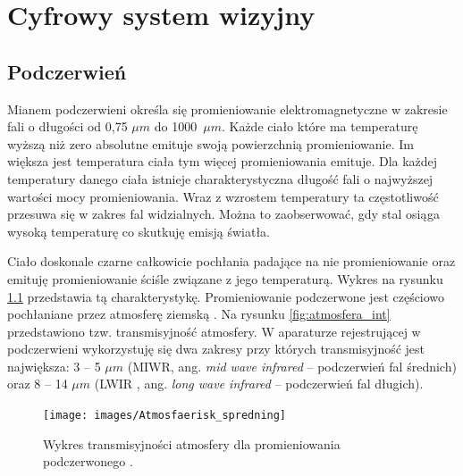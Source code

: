 \chapter{Cyfrowy system wizyjny}
\label{cha:csw}



\section{Podczerwień}

Mianem podczerwieni określa się promieniowanie elektromagnetyczne w zakresie fali o długości od 0,75 $\mu m$ do 1000~$\mu m$.
Każde ciało które ma temperaturę wyższą niż zero absolutne emituje swoją powierzchnią promieniowanie. 
Im większa jest temperatura ciała tym więcej promieniowania emituje. %
Dla każdej temperatury danego ciała istnieje charakterystyczna długość fali o najwyższej wartości mocy promieniowania. 
Wraz z wzrostem temperatury ta częstotliwość przesuwa się w zakres fal widzialnych. 
Można to zaobserwować, gdy stal osiąga wysoką temperaturę co skutkuję emisją światła. 

Ciało doskonale czarne całkowicie pochłania padające na nie promieniowanie oraz emituję promieniowanie ściśle związane z jego temperaturą. 
Wykres na rysunku \ref{fig:perfect_black} przedstawia tą charakterystykę. 
Promieniowanie podczerwone jest częściowo pochłaniane przez atmosferę ziemską . 
Na rysunku \ref{fig:atmosfera_int} przedstawiono  tzw. transmisyjność atmosfery. 
W aparaturze rejestrującej w podczerwieni wykorzystuję się dwa zakresy przy których transmisyjność jest największa: 3 -- 5 $\mu m$ (MIWR, ang. \textit{mid wave infrared} -- podczerwień fal średnich) oraz 8 -- 14 $\mu m$ (LWIR , ang. \textit{long wave infrared} -- podczerwień fal długich)\cite{niklaus2007mems}.

\begin{figure}
\centering
\texttt{[image: images/Atmosfaerisk\_spredning]}
\caption[Wykres transmisyjności atmosfery dla promieniowania podczerwonego ]{Wykres transmisyjności atmosfery dla promieniowania podczerwonego \cite{wiki:infrared}.}
\label{fig:perfect_black}
\end{figure}

